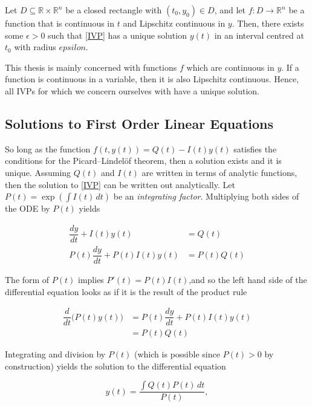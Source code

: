 \begin{theorem}
	Let $D \subseteq \mathbb{R} \times \mathbb{R}^n$ be a closed rectangle with $(t_0, y_0) \in D$, and let $f : D \to \mathbb{R}^n$ be a function that is continuous in $t$ and Lipschitz continuous in $y$.  Then, there exists some $\epsilon>0$ such that \cref{IVP} has a unique solution $y(t)$ in an interval centred at $t_0$ with radius $epsilon$.
\end{theorem}

\noindent This thesis is mainly concerned with functions $f$ which are continuous in $y$.  If a function is continuous in a variable, then it is also Lipschitz continuous.  Hence, all IVPs for which we concern ourselves with have a unique solution. 


\subsection{Solutions to First Order Linear Equations}

So long as the function $f(t, y(t)) = Q(t) - I(t) y(t)$ satisfies the conditions for the Picard–Lindelöf theorem, then a solution exists and it is unique.  Assuming $Q(t)$ and $I(t)$ are written in terms of analytic functions, then the solution to \cref{IVP} can be written out analytically.  Let $P(t) = \exp(\int I(t) \, dt)$ be an \textit{integrating factor}.  Multiplying both sides of the ODE by $P(t)$ yields

\begin{align}
	\dfrac{dy}{dt} + I(t)y(t) &= Q(t) \\
	P(t)\dfrac{dy}{dt} + P(t)I(t)y(t) &= P(t)Q(t) 
\end{align}

\noindent  The form of $P(t)$ implies $P'(t) = P(t)I(t)$,and so the left hand side of the differential equation looks as if it is the result of the product rule

\begin{align}
 \dfrac{d}{dt} \Big( P(t)y(t) \Big) &= P(t)\dfrac{dy}{dt} + P(t)I(t)y(t) \\
														  &= P(t) Q(t)
\end{align}

\noindent Integrating and division by $P(t)$ (which is possible since $P(t)>0$ by construction) yields the solution to the differential equation

\begin{equation}
	y(t) = \dfrac{\int Q(t) P(t)\, dt}{P(t)},
\end{equation}


